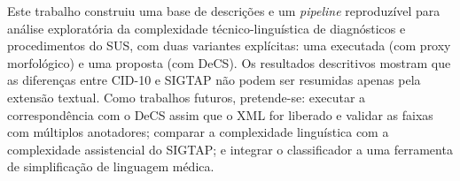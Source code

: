 \documentclass[12pt]{article}
\begin{document}
Este trabalho construiu uma base de descrições e um \textit{pipeline}
reproduzível para análise exploratória da complexidade técnico-linguística
de diagnósticos e procedimentos do SUS, com duas variantes explícitas:
uma executada (com proxy morfológico) e uma proposta (com DeCS). Os
resultados descritivos mostram que as diferenças entre CID-10 e SIGTAP não
podem ser resumidas apenas pela extensão textual. Como trabalhos futuros,
pretende-se: executar a correspondência com o DeCS assim que o XML for
liberado e validar as faixas com múltiplos anotadores; comparar a
complexidade linguística com a complexidade assistencial do SIGTAP; e
integrar o classificador a uma ferramenta de simplificação de linguagem
médica.



\end{document}
